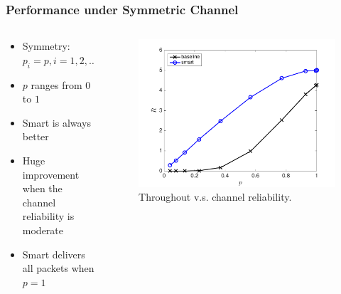 \documentclass{beamer}
\begin{document}
\begin{frame}
\frametitle{Performance under Symmetric Channel}
\begin{columns}
  \begin{column}{.5\textwidth}
    \begin{itemize}
      \item Symmetry: $p_i=p, i=1,2,\dotsc,N$
      \item $p$ ranges from $0$ to $1$
      \item Smart is always better
      \item Huge improvement when the channel reliability is moderate
      \item Smart delivers all packets when $p=1$
    \end{itemize}
  \end{column}
  \begin{column}{.5\textwidth}
    \begin{figure}[htbp]
      \centering
      \includegraphics[height=.5\textheight]{R_p_sym.pdf}
      \caption{Throughout v.s. channel reliability.}
    \end{figure}
  \end{column}
\end{columns}
\end{frame}
\end{document}
